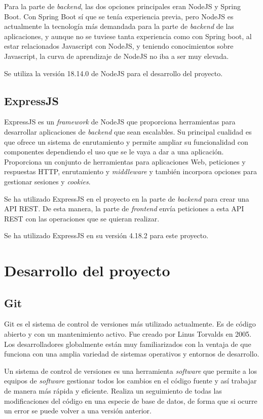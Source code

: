 Para la parte de \textit{backend}, las dos opciones principales eran NodeJS y Spring Boot. Con Spring Boot sí que se tenía experiencia previa, pero NodeJS es actualmente la tecnología más demandada para la parte de \textit{backend} de las aplicaciones, y aunque no se tuviese tanta experiencia como con Spring boot, al estar relacionados Javascript con NodeJS, y teniendo conocimientos sobre Javascript, la curva de aprendizaje de NodeJS no iba a ser muy elevada.

Se utiliza la versión 18.14.0 de NodeJS para el desarrollo del proyecto.

\subsection{ExpressJS}
ExpressJS \cite{expressJS} es un \textit{framework} de NodeJS que proporciona herramientas para desarrollar aplicaciones de \textit{backend} que sean escalables. Su principal cualidad es que ofrece un sistema de enrutamiento y permite ampliar su funcionalidad con componentes dependiendo el uso que se le vaya a dar a una aplicación. Proporciona un conjunto de herramientas para aplicaciones Web, peticiones y respuestas HTTP, enrutamiento y \textit{middleware} y también incorpora opciones para gestionar sesiones y \textit{cookies}.

Se ha utilizado ExpressJS en el proyecto en la parte de \textit{backend} para crear una API REST. De esta manera, la parte de \textit{frontend} envía peticiones a esta API REST con las operaciones que se quieran realizar.

Se ha utilizado ExpressJS en su versión 4.18.2 para este proyecto.

\section{Desarrollo del proyecto}
\subsection{Git}
Git \cite{git} es el sistema de control de versiones más utilizado actualmente. Es de código abierto y con un mantenimiento activo. Fue creado por Linus Torvalds en 2005. Los desarrolladores globalmente están muy familiarizados con la ventaja de que funciona con una amplia variedad de sistemas operativos y entornos de desarrollo. 

Un sistema de control de versiones \cite{control-versiones} es una herramienta \textit{software} que permite a los equipos de \textit{software} gestionar todos los cambios en el código fuente y así trabajar de manera más rápida y eficiente. Realiza un seguimiento de todas las modificaciones del código en una especie de base de datos, de forma que si ocurre un error se puede volver a una versión anterior.

